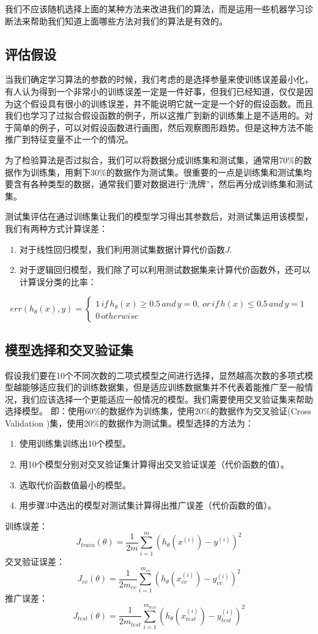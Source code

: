 \documentclass[cn,hazy,blue,normal,14pt]{elegantnote}
\begin{document}
我们不应该随机选择上面的某种方法来改进我们的算法，而是运用一些机器学习诊断法来帮助我们知道上面哪些方法对我们的算法是有效的。

\subsection{评估假设}
当我们确定学习算法的参数的时候，我们考虑的是选择参量来使训练误差最小化，有人认为得到一个非常小的训练误差一定是一件好事，但我们已经知道，仅仅是因为这个假设具有很小的训练误差，并不能说明它就一定是一个好的假设函数。而且我们也学习了过拟合假设函数的例子，所以这推广到新的训练集上是不适用的。对于简单的例子，可以对假设函数进行画图，然后观察图形趋势。但是这种方法不能推广到特征变量不止一个的情况。

为了检验算法是否过拟合，我们可以将数据分成训练集和测试集，通常用70\%的数据作为训练集，用剩下30\%的数据作为测试集。很重要的一点是训练集和测试集均要含有各种类型的数据，通常我们要对数据进行“洗牌”，然后再分成训练集和测试集。

测试集评估在通过训练集让我们的模型学习得出其参数后，对测试集运用该模型，我们有两种方式计算误差：
\begin{enumerate}
    \item 对于线性回归模型，我们利用测试集数据计算代价函数$J$.
    \item 对于逻辑回归模型，我们除了可以利用测试数据集来计算代价函数外，还可以计算误分类的比率：
\end{enumerate}
$$
err(h_\theta(x),y)=\begin{cases}
    1 \, if \, h_\theta(x) \geqslant 0.5 \, and \,y=0,\, or \, if \, h(x) \leqslant 0.5 \, and \, y=1 \\
    0 \, otherwise 
\end{cases}
$$
\subsection{模型选择和交叉验证集}
假设我们要在10个不同次数的二项式模型之间进行选择，显然越高次数的多项式模型越能够适应我们的训练数据集，但是适应训练数据集并不代表着能推广至一般情况，我们应该选择一个更能适应一般情况的模型。我们需要使用交叉验证集来帮助选择模型。 即：使用60\%的数据作为训练集，使用20\%的数据作为交叉验证(Cross Validation )集，使用20\%的数据作为测试集。模型选择的方法为：
\begin{enumerate}
    \item 使用训练集训练出10个模型。
    \item 用10个模型分别对交叉验证集计算得出交叉验证误差（代价函数的值）。
    \item 选取代价函数值最小的模型。
    \item 用步骤3中选出的模型对测试集计算得出推广误差（代价函数的值）。
\end{enumerate}
\begin{note}
训练误差：
$$
J_{train}(\theta)=\frac{1}{2m}\sum_{i=1}^m(h_\theta(x^{(i)})-y^{(i)})^2
$$
交叉验证误差：
$$
J_{cv}(\theta)=\frac{1}{2m_{cv}}\sum_{i=1}^{m_{cv}}(h_\theta(x_{cv}^{(i)})-y_{cv}^{(i)})^2
$$
推广误差：
$$
J_{test}(\theta)=\frac{1}{2m_{test}}\sum_{i=1}^{m_{test}}(h_\theta(x_{test}^{(i)})-y_{test}^{(i)})^2
$$
\end{note}
\end{document}
